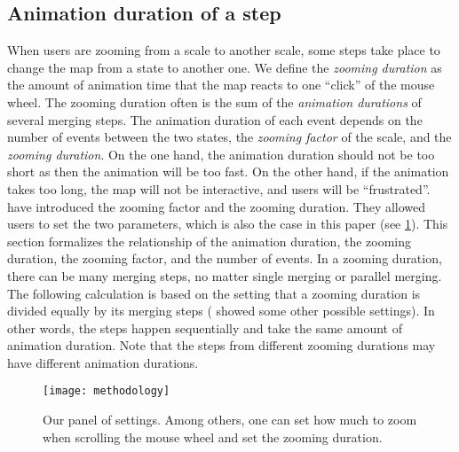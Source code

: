 \documentclass[]{interact}
\begin{document}


\subsection{Animation duration of a step}
\label{sec:zooming_duration}

When users are zooming from a scale to another scale,
some steps take place to change the map from a state to another one.
We define the \emph{zooming duration} as the amount of 
animation time that the map reacts to one ``click'' of the mouse wheel.
The zooming duration often is the sum of 
the \emph{animation durations} of several merging steps.
The animation duration of each event depends on 
the number of events between the two states,
the \emph{zooming factor} of the scale, and 
the \emph{zooming duration}.
On the one hand, the animation duration should not be too short 
as then the animation will be too fast. 
On the other hand, if the animation takes too long, 
the map will not be interactive, and users will be ``frustrated''.
\citet[][]{Meijers2020Web} 
have introduced the zooming factor and the zooming duration.
They allowed users to set the two parameters,
which is also the case in this paper
(see \fig\ref{fig:interaction_settings}).
This section formalizes the relationship of the animation duration,
the zooming duration, the zooming factor, and the number of events.
In a zooming duration, there can be many merging steps,
no matter single merging or parallel merging.
The following calculation is based on the setting that
a zooming duration is divided equally by its merging steps
(\citet[][]{Suba2017Thesis} showed some other possible settings).
In other words,
the steps happen sequentially and take the same amount of animation duration.
Note that the steps from different zooming durations 
may have different animation durations.

\begin{figure}[tb]
\centering
\texttt{[image: methodology]}
\caption{Our panel of settings. 
Among others, one can set how much to zoom when scrolling the mouse wheel 
and set the zooming duration.}
\label{fig:interaction_settings}
\end{figure}
\end{document}
